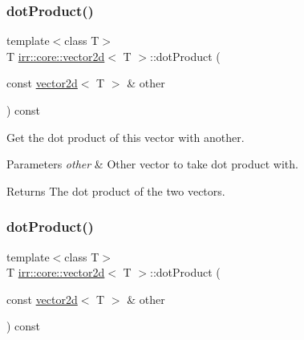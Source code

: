 \subsubsection{\texorpdfstring{dot\+Product()}{dotProduct()}\hspace{0.1cm}{\footnotesize\ttfamily [1/2]}}
{\footnotesize\ttfamily template$<$class T$>$ \\
T \hyperlink{classirr_1_1core_1_1vector2d}{irr\+::core\+::vector2d}$<$ T $>$\+::dot\+Product (\begin{DoxyParamCaption}\item[{const \hyperlink{classirr_1_1core_1_1vector2d}{vector2d}$<$ T $>$ \&}]{other }\end{DoxyParamCaption}) const\hspace{0.3cm}{\ttfamily [inline]}}



Get the dot product of this vector with another. 


\begin{DoxyParams}{Parameters}
{\em other} & Other vector to take dot product with. \\
\hline
\end{DoxyParams}
\begin{DoxyReturn}{Returns}
The dot product of the two vectors. 
\end{DoxyReturn}
\mbox{\label{classirr_1_1core_1_1vector2d_acf2fea122833c456c6dd66811acc8b91}} 
\subsubsection{\texorpdfstring{dot\+Product()}{dotProduct()}\hspace{0.1cm}{\footnotesize\ttfamily [2/2]}}
{\footnotesize\ttfamily template$<$class T$>$ \\
T \hyperlink{classirr_1_1core_1_1vector2d}{irr\+::core\+::vector2d}$<$ T $>$\+::dot\+Product (\begin{DoxyParamCaption}\item[{const \hyperlink{classirr_1_1core_1_1vector2d}{vector2d}$<$ T $>$ \&}]{other }\end{DoxyParamCaption}) const\hspace{0.3cm}{\ttfamily [inline]}}



